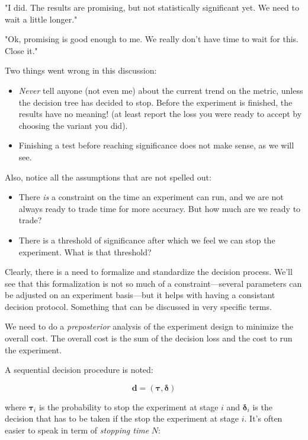 \documentclass{tufte-book}
\begin{document}
"I did. The results are promising, but not statistically significant yet. We need to wait a little longer."

"Ok, promising is good enough to me. We really don't have time to wait for this. Close it."

Two things went wrong in this discussion:

\begin{itemize}
  \item \textit{Never} tell anyone (not even me) about the current trend on the metric, unless the decision
    tree has decided to stop. Before the experiment is finished, the results have no meaning! (at least report
    the loss you were ready to accept by choosing the variant you did).
  \item Finishing a test before reaching significance does not make sense, as we will see.
\end{itemize}

Also, notice all the assumptions that are not spelled out:

\begin{itemize}
  \item There \textit{is} a constraint on the time an experiment can run, and we are not always ready to trade
    time for more accuracy. But how much are we ready to trade?
  \item There is a threshold of significance after which we feel we can stop the experiment. What is that
      threshold?
\end{itemize}

Clearly, there is a need to formalize and standardize the decision process. We'll see that this formalization
is not so much of a constraint---several parameters can be adjusted on an experiment basis---but it helps with
having a consistant decision protocol. Something that can be discussed in very specific terms.


We need to do a \textit{preposterior} analysis of the experiment design to minimize the overall cost. The
overall cost is the sum of the decision loss and the cost to run the experiment.

A sequential decision procedure is noted:

\begin{equation}
  \mathbf{d} = \left(\mathbf{\tau}, \mathbf{\delta}\right)
\end{equation}

where $\mathbf{\tau}_i$ is the probability to stop the experiment at stage $i$ and $\mathbf{\delta}_i$ is the
decision that has to be taken if the stop the experiment at stage $i$. It's often easier to speak in term of
\textit{stopping time} $N$:
\end{document}
